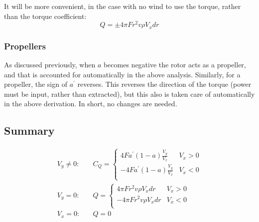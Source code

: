 \documentclass{article}
\begin{document}
It will be more convenient, in the case with no wind to use the torque, rather than the torque coefficient:
\begin{equation}
    Q = \pm 4 \pi F r^2 v \rho V_x dr
\end{equation}

\subsubsection{Propellers}

As discussed previously, when $a$ becomes negative the rotor acts as a propeller, and that is accounted for automatically in the above analysis.  Similarly, for a propeller, the sign of $a^\prime$ reverses.  This reverses the direction of the torque (power must be input, rather than extracted), but this also is taken care of automatically in the above derivation.  In short, no changes are needed.

\subsection{Summary}



\begin{equation}
\begin{aligned}
    V_y \ne 0:&\quad
    C_Q = \begin{cases}
        4 F a^\prime (1-a) \frac{V_y}{V_x} &  V_x > 0 \\
        - 4 F a^\prime (1-a) \frac{V_y}{V_x} &  V_x < 0 \\
    \end{cases}\\
    V_y = 0:&\quad
    Q = \begin{cases}
        4 \pi F r^2 v \rho V_x dr &  V_x > 0 \\
        -4 \pi F r^2 v \rho V_x dr &  V_x < 0 \\
    \end{cases}\\
    V_x = 0:&\quad Q = 0\\
\end{aligned}
\label{eq:CQmom}
\end{equation}
\end{document}
